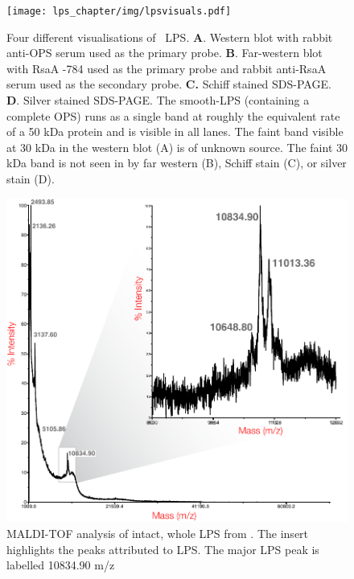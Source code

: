   \begin{figure}[htp]
    \begin{center}
      \texttt{[image: lps\_chapter/img/lpsvisuals.pdf]}
    \end{center}
    \caption[Four different visualisations of \caulobacter\ \ac{LPS}]{Four different visualisations
      of \caulobacter\ \ac{LPS}. \textbf{A}. Western blot with rabbit anti-\ac{OPS} serum used as
      the primary probe. \textbf{B}. Far-western blot with RsaA -784 used as the primary
      probe and rabbit anti-RsaA serum used as the secondary probe. \textbf{C.} Schiff stained
      \ac{SDS-PAGE}. \textbf{D}. Silver stained \ac{SDS-PAGE}. The smooth-\ac{LPS} (\ie containing a
      complete \ac{OPS}) runs as a single band at roughly the equivalent rate of a 50 kDa protein
      and is visible in all lanes. The faint band visible at 30 kDa in the western blot (A) is of
      unknown source. The faint 30 kDa band is not seen in by far western (B), Schiff stain (C), or
      silver stain (D).}
    \label{fig:lpsvisuals}
  \end{figure}

  \begin{figure}[htb]
    \begin{center}
      \includegraphics[]{lps_chapter/img/malditof.pdf}
    \end{center}
    \caption[\Ac{MALDI-TOF} analysis of intact, whole \ac{LPS} from \caulobacter]{\ac{MALDI-TOF}
      analysis of intact, whole \ac{LPS} from \caulobacter. The insert highlights the peaks
      attributed to \ac{LPS}. The major \ac{LPS} peak is labelled 10834.90 m/z}
    \label{fig:lpsmalditof}
  \end{figure}

